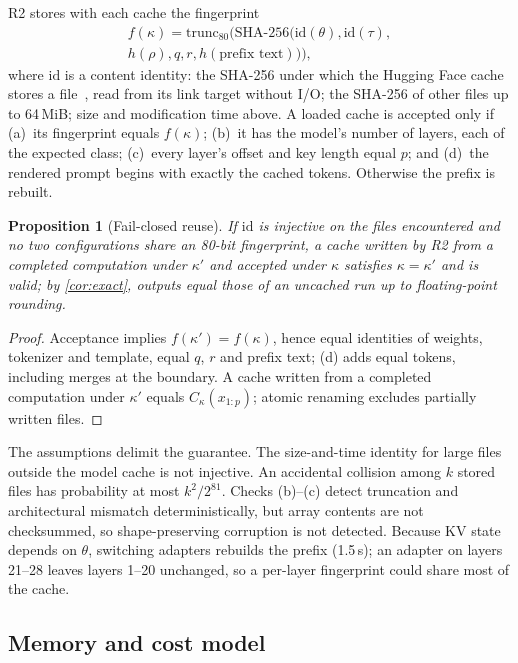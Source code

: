 \documentclass[journal]{IEEEtran}
\newtheorem{proposition}{Proposition}
\theoremstyle{definition}
\begin{document}
R2 stores with each cache the fingerprint
\begin{multline}
f(\kappa)=\mathrm{trunc}_{80}\big(\mathrm{SHA\text{-}256}(\mathrm{id}(\theta),\mathrm{id}(\tau),\\
h(\rho),q,r,h(\text{prefix text}))\big),\label{eq:fp}
\end{multline}
where $\mathrm{id}$ is a content identity: the SHA-256 under which the Hugging Face cache stores a
file~\cite{hfcache2025}, read from its link target without I/O; the SHA-256 of other files up to
64\,MiB; size and modification time above. A loaded cache is accepted only if (a)~its fingerprint
equals $f(\kappa)$; (b)~it has the model's number of layers, each of the expected class; (c)~every
layer's offset and key length equal $p$; and (d)~the rendered prompt begins with exactly the cached
tokens. Otherwise the prefix is rebuilt.

\begin{proposition}[Fail-closed reuse]\label{prop:validity}
If $\mathrm{id}$ is injective on the files encountered and no two configurations share an 80-bit
fingerprint, a cache written by R2 from a completed computation under $\kappa'$ and accepted under
$\kappa$ satisfies $\kappa=\kappa'$ and is valid; by \cref{cor:exact}, outputs equal those of an
uncached run up to floating-point rounding.
\end{proposition}
\begin{proof}
Acceptance implies $f(\kappa')=f(\kappa)$, hence equal identities of weights, tokenizer and
template, equal $q$, $r$ and prefix text; (d) adds equal tokens, including merges at the boundary.
A cache written from a completed computation under $\kappa'$ equals $C_{\kappa}(x_{1:p})$; atomic
renaming excludes partially written files.
\end{proof}

The assumptions delimit the guarantee. The size-and-time identity for large files outside the model
cache is not injective. An accidental collision among $k$ stored files has probability at most
$k^2/2^{81}$. Checks (b)--(c) detect truncation and architectural mismatch deterministically, but
array contents are not checksummed, so shape-preserving corruption is not detected. Because KV state
depends on $\theta$, switching adapters rebuilds the prefix (1.5\,s); an adapter on layers 21--28
leaves layers 1--20 unchanged, so a per-layer fingerprint could share most of the cache.

\subsection{Memory and cost model}\label{sec:cost}
\end{document}

